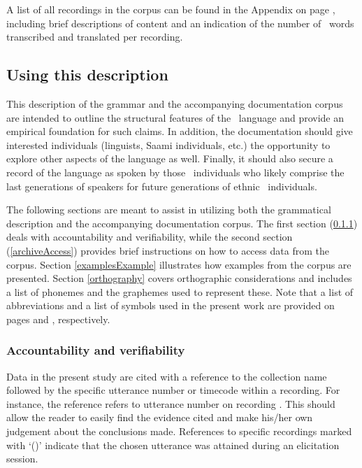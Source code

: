  A list of all recordings in the corpus can be found in the Appendix on page \pageref{inventory}, including brief descriptions of content and an indication of the number of \PS\ words transcribed and translated per recording. 




\subsection{Using this description}\label{usingThis}  
This description of the grammar and the accompanying documentation corpus are intended to outline the structural features of the \PS\ language and provide an empirical foundation for such claims. In addition, the documentation should give interested individuals (linguists, Saami individuals, etc.) the opportunity to explore other aspects of the language as well. Finally, it should also secure a record of the language as spoken by those \PS\ individuals who likely comprise the last generations of speakers for future generations of ethnic \PS\ individuals. 

The following sections are meant to assist in utilizing both the grammatical description and the accompanying documentation corpus. 
The first section (\ref{accountabilityEtc}) deals with accountability and verifiability, while the second section (\ref{archiveAccess}) provides brief instructions on how to access data from the corpus. 
Section \ref{examplesExample} illustrates how examples from the corpus are presented. %
Section \ref{orthography} covers orthographic considerations and includes a list of phonemes and the graphemes used to represent these. 
Note that a list of abbreviations and a list of symbols used in the present work are provided on pages \pageref{abbreviations} and \pageref{symbolList}, respectively. 


\subsubsection{Accountability and verifiability}\label{accountabilityEtc}
Data in the present study are cited with a reference to the collection name followed by the specific utterance number or timecode within a recording. For instance, the reference  refers to utterance number  on recording . %
This should allow the reader to easily find the evidence cited and make his/her own judgement about the conclusions made. References to specific recordings marked with ‘()’ indicate that the chosen utterance was attained during an elicitation session. 

